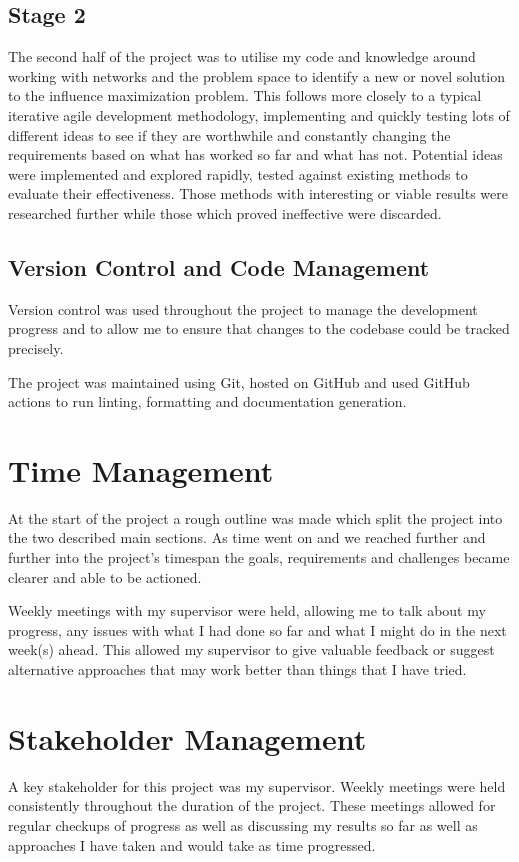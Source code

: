 \documentclass{article}
\begin{document}
\subsection{Stage 2}
The second half of the project was to utilise my code and knowledge around working with networks and the problem space to identify a new or novel solution to the influence maximization problem.
This follows more closely to a typical iterative agile development methodology, implementing and quickly testing lots of different ideas to see if they are worthwhile and constantly changing the requirements based on what has worked so far and what has not.
Potential ideas were implemented and explored rapidly, tested against existing methods to evaluate their effectiveness.
Those methods with interesting or viable results were researched further while those which proved ineffective were discarded.

\subsection{Version Control and Code Management}
Version control was used throughout the project to manage the development progress and to allow me to ensure that changes to the codebase could be tracked precisely.

The project was maintained using Git, hosted on GitHub and used GitHub actions to run linting, formatting and documentation generation.

\section{Time Management}
At the start of the project a rough outline was made which split the project into the two described main sections.
As time went on and we reached further and further into the project's timespan the goals, requirements and challenges became clearer and able to be actioned.

Weekly meetings with my supervisor were held, allowing me to talk about my progress, any issues with what I had done so far and what I might do in the next week(s) ahead.
This allowed my supervisor to give valuable feedback or suggest alternative approaches that may work better than things that I have tried.

\section{Stakeholder Management}

A key stakeholder for this project was my supervisor.
Weekly meetings were held consistently throughout the duration of the project.
These meetings allowed for regular checkups of progress as well as discussing my results so far as well as approaches I have taken and would take as time progressed.
\end{document}
